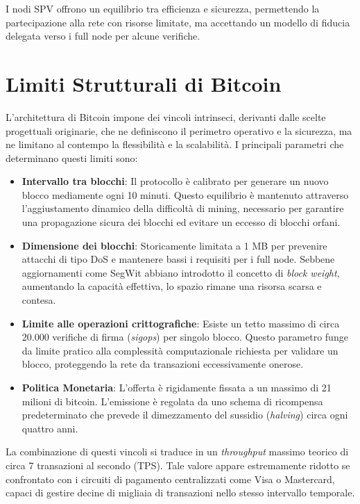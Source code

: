 I nodi SPV offrono un equilibrio tra efficienza e sicurezza, permettendo la partecipazione alla rete con risorse limitate, ma accettando un modello di fiducia delegata verso i full node per alcune verifiche.

\section{Limiti Strutturali di Bitcoin}

L'architettura di Bitcoin impone dei vincoli intrinseci, derivanti dalle scelte progettuali originarie, che ne definiscono il perimetro operativo e la sicurezza, ma ne limitano al contempo la flessibilità e la scalabilità. I principali parametri che determinano questi limiti sono:

\begin{itemize}
    \item \textbf{Intervallo tra blocchi}: Il protocollo è calibrato per generare un nuovo blocco mediamente ogni 10 minuti. Questo equilibrio è mantenuto attraverso l'aggiustamento dinamico della difficoltà di mining, necessario per garantire una propagazione sicura dei blocchi ed evitare un eccesso di blocchi orfani.
    
    \item \textbf{Dimensione dei blocchi}: Storicamente limitata a 1 MB per prevenire attacchi di tipo DoS e mantenere bassi i requisiti per i full node. Sebbene aggiornamenti come SegWit abbiano introdotto il concetto di \textit{block weight}, aumentando la capacità effettiva, lo spazio rimane una risorsa scarsa e contesa.
    
    \item \textbf{Limite alle operazioni crittografiche}: Esiste un tetto massimo di circa 20.000 verifiche di firma (\textit{sigops}) per singolo blocco. Questo parametro funge da limite pratico alla complessità computazionale richiesta per validare un blocco, proteggendo la rete da transazioni eccessivamente onerose.
    
    \item \textbf{Politica Monetaria}: L'offerta è rigidamente fissata a un massimo di 21 milioni di bitcoin. L'emissione è regolata da uno schema di ricompensa predeterminato che prevede il dimezzamento del sussidio (\textit{halving}) circa ogni quattro anni.
\end{itemize}

La combinazione di questi vincoli si traduce in un \textit{throughput} massimo teorico di circa 7 transazioni al secondo (TPS). Tale valore appare estremamente ridotto se confrontato con i circuiti di pagamento centralizzati come Visa o Mastercard, capaci di gestire decine di migliaia di transazioni nello stesso intervallo temporale.

